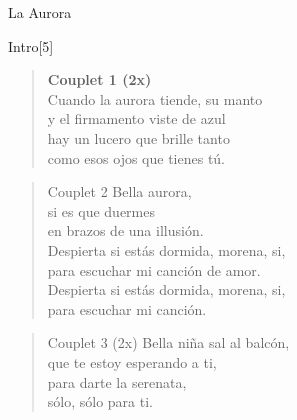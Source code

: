 \begin{song}[vals]{La Aurora}
\begin{instrumental}{Intro}[5]
 \measure{}   \measure{}
\measure{} \measure{} \measure*{} 
\measure{}  
 \measure{} \measure{}  \measure{}
 \measure{}  \measure{}  
\end{instrumental}
\begin{verse}{}
\hspace{-2em}\textbf{Couplet 1 (2x)}\\
Cuando la aurora tiende, su manto\\
y el firmamento viste de azul\hspace{3em}
\\ hay un lucero que brille tanto\\
como esos ojos que tienes tú.\hspace{3em}\\
\end{verse}
\begin{verse}{Couplet 2}
Bella aurora,\\
si es que duermes\\
en brazos de una illusión.\hspace{1em}\\
Despierta si estás dormida, morena, si,\\
para escuchar mi canción de amor.\\
Despierta si estás dormida, morena, si,\\
para escuchar mi canción.\hspace{1em}\hspace{2em}\\
\end{verse}
\vspace{4ex}
\vspace{-1ex}
\begin{verse}{Couplet 3 (2x)}
Bella niña sal al balcón,\\
que te estoy esperando a ti,\\
para darte la serenata,\\
sólo, sólo para ti. \hspace{1em}\hspace{2em}\\
\end{verse}
\end{song}


